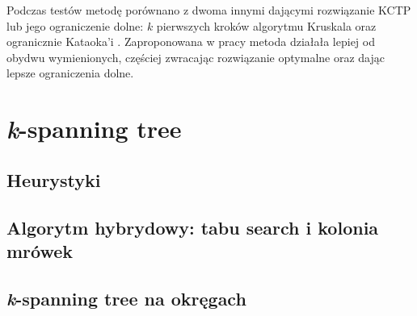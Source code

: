 \documentclass[12pt]{article}
\begin{document}
Podczas testów metodę porównano z dwoma innymi dającymi rozwiązanie KCTP lub jego ograniczenie dolne: $k$ pierwszych kroków algorytmu Kruskala \cite{kruskal} oraz ogranicznie Kataoka'i \cite{rooted}. Zaproponowana w pracy metoda działała lepiej od obydwu wymienionych, częściej zwracając rozwiązanie optymalne oraz dając lepsze ograniczenia dolne.

\section{\textit{k}-spanning tree}

\subsection{Heurystyki}



\subsection{Algorytm hybrydowy: tabu search i kolonia mrówek}



\subsection{\textit{k}-spanning tree na okręgach}



\newpage



\end{document}
